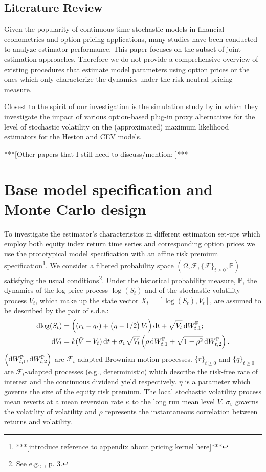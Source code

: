 \documentclass[11pt,a4paper,notitlepage]{article}
\numberwithin{equation}{section}
\begin{document}
\subsection{Literature Review}
Given the popularity of continuous time stochastic models in financial econometrics and option pricing applications, many studies have been conducted to analyze estimator performance. This paper focuses on the subset of joint estimation approaches. Therefore we do not provide a comprehensive overview of existing procedures that estimate model parameters using option prices or the ones  which only characterize the dynamics under the risk neutral pricing measure. 

Closest to the spirit of our investigation is the simulation study by \cite{ai2007maximum} in which they investigate the impact of various option-based plug-in proxy alternatives for the level of stochastic volatility on the (approximated) maximum likelihood estimators for the Heston and CEV models. 

***[Other papers that I still need to discuss/mention: \cite{garcia2011estimation}]***




\section{Base model specification and Monte Carlo design}
To investigate the estimator's characteristics in different estimation set-ups which employ both equity index return time series and corresponding option prices we use the prototypical \citep{heston} model specification with an affine risk premium specification\footnote{***[introduce reference to appendix about pricing kernel here]***}. We consider a filtered probability space $\left(\Omega, \mathcal{F}, \lbrace\mathcal{F}\rbrace_{t\geq0}, \mathbb{P} \right)$ satisfying the usual conditions\footnote{See e.g., \citet{protterstochastic}, p. 3.}. Under the historical probability measure, $\mathbb{P}$, the dynamics of the log-price process $\log(S_t)$ and of the stochastic volatility process $V_t$, which make up the state vector $X_t = [\log(S_t), V_t]$, are assumed to be described by the pair of s.d.e.:
\begin{align}
	\dif{\log(S_t)} &= \left((r_t-q_t)+ \left(\eta-1/2\right) V_t \right)\dif t + \sqrt{V_t} \dif W_{t,1}^\mathbb{P}; \label{PHestonS}\\
	\dif{V_t} &= k(\bar{V}-V_t)\dif t + \sigma_v\sqrt{V_t}\left(\rho \dif W_{t,1}^\mathbb{P} + \sqrt{1-\rho^2}\dif W_{t,2}^\mathbb{P}\right). \label{PHestonV}
\end{align}
$\left(\dif W_{t,1}^\mathbb{P}, \dif W_{t,2}^\mathbb{P}\right)$ are $\mathcal{F}_t$-adapted Brownian motion processes. $\lbrace r \rbrace_{t\geq 0}$  and  $\lbrace q \rbrace_{t\geq 0}$ are $\mathcal{F}_t$-adapted processes (e.g., deterministic) which describe the risk-free rate of interest and the continuous dividend yield respectively. $\eta$ is a parameter which governs the size of the equity risk premium. The local stochastic volatility process mean reverts at a mean reversion rate $\kappa$ to the long run mean level $\bar{V}$. $\sigma_v$ governs the volatility of volatility and $\rho$ represents the instantaneous correlation between returns and volatility.
\end{document}
